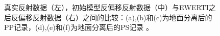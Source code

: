 \begin{figure}[!htb]
   \caption{真实反射数据（左），初始模型反偏移反射数据（中）与EWERTI之后反偏移反射数据（右）之间的比较：(a),(b)和(c)为地面分离后的PP记录，(d),(e)和(f)为地面分离后的PS记录
   。}
   \label{fig:Data_comparison}
\end{figure}

